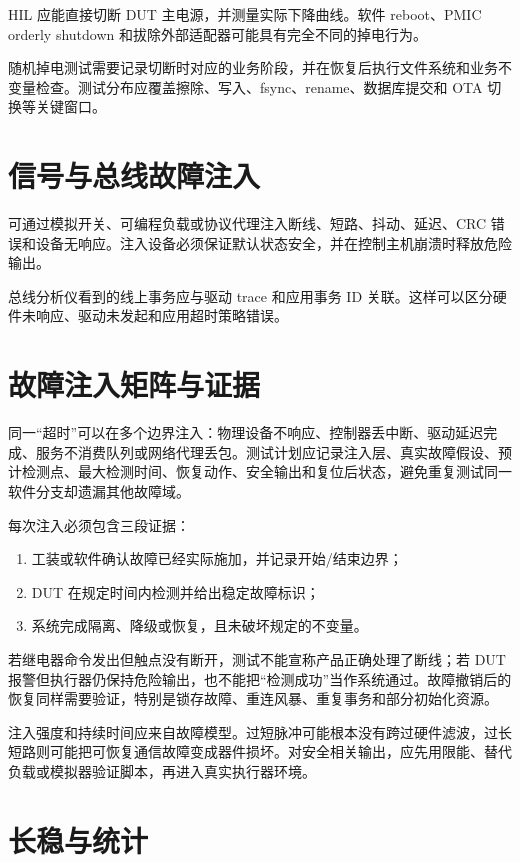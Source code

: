 HIL 应能直接切断 DUT 主电源，并测量实际下降曲线。软件 reboot、PMIC orderly shutdown 和拔除外部适配器可能具有完全不同的掉电行为。

随机掉电测试需要记录切断时对应的业务阶段，并在恢复后执行文件系统和业务不变量检查。测试分布应覆盖擦除、写入、fsync、rename、数据库提交和 OTA 切换等关键窗口。

\section{信号与总线故障注入}

可通过模拟开关、可编程负载或协议代理注入断线、短路、抖动、延迟、CRC 错误和设备无响应。注入设备必须保证默认状态安全，并在控制主机崩溃时释放危险输出。

总线分析仪看到的线上事务应与驱动 trace 和应用事务 ID 关联。这样可以区分硬件未响应、驱动未发起和应用超时策略错误。

\section{故障注入矩阵与证据}

同一“超时”可以在多个边界注入：物理设备不响应、控制器丢中断、驱动延迟完成、服务不消费队列或网络代理丢包。测试计划应记录注入层、真实故障假设、预计检测点、最大检测时间、恢复动作、安全输出和复位后状态，避免重复测试同一软件分支却遗漏其他故障域。

每次注入必须包含三段证据：
\begin{enumerate}
  \item 工装或软件确认故障已经实际施加，并记录开始/结束边界；
  \item DUT 在规定时间内检测并给出稳定故障标识；
  \item 系统完成隔离、降级或恢复，且未破坏规定的不变量。
\end{enumerate}

若继电器命令发出但触点没有断开，测试不能宣称产品正确处理了断线；若 DUT 报警但执行器仍保持危险输出，也不能把“检测成功”当作系统通过。故障撤销后的恢复同样需要验证，特别是锁存故障、重连风暴、重复事务和部分初始化资源。

注入强度和持续时间应来自故障模型。过短脉冲可能根本没有跨过硬件滤波，过长短路则可能把可恢复通信故障变成器件损坏。对安全相关输出，应先用限能、替代负载或模拟器验证脚本，再进入真实执行器环境。

\section{长稳与统计}


